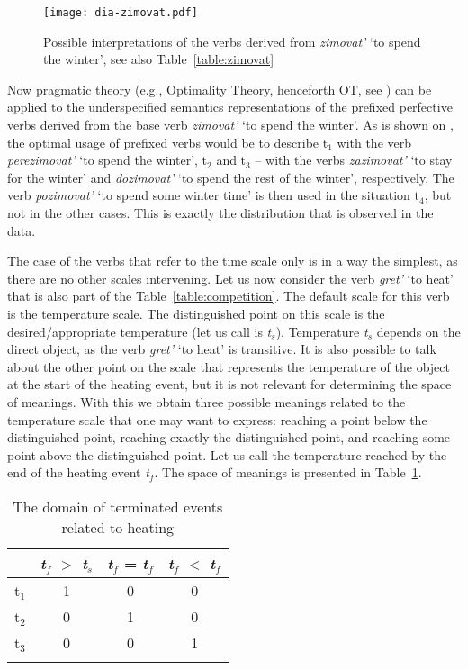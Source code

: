 \begin{figure}
\centering
\texttt{[image: dia-zimovat.pdf]}
\caption{Possible interpretations of the verbs derived from \textit{zimovat'} `to spend the winter', see also Table~\ref{table:zimovat} \label{fig:zimovat}}
\end{figure}

Now pragmatic theory (e.g., Optimality Theory, henceforth OT, see \citealt{Blutner:00, vanRooy:04, Benz:11}) can be applied to the underspecified semantics representations of the prefixed perfective verbs derived from the base verb \textit{zimovat'} `to spend the winter'. As is shown on , the optimal usage of prefixed verbs would be to describe t$_1$ with the verb \textit{perezimovat'} `to spend the winter', t$_2$ and t$_3$ -- with the verbs \textit{zazimovat'} `to stay for the winter' and \textit{dozimovat'} `to spend the rest of the winter', respectively. The verb \textit{pozimovat'} `to spend some winter time' is then used in the situation t$_4$, but not in the other cases. This is exactly the distribution that is observed in the data. 

The case of the verbs that refer to the time scale only is in a way the simplest, as there are no other scales intervening. Let us now consider the verb \textit{gret'} `to heat' that is also part of the Table~\ref{table:competition}. The default scale for this verb is the temperature scale. The distinguished point on this scale is the desired/appropriate temperature (let us call is \textit{t$_s$}). Temperature \textit{t$_s$} depends on the direct object, as the verb \textit{gret'} `to heat' is transitive. It is also possible to talk about the other point on the scale that represents the temperature of the object at the start of the heating event, but it is not relevant for determining the space of meanings. With this we obtain three possible meanings related to the temperature scale that one may want to express: reaching a point below the distinguished point, reaching exactly the distinguished point, and reaching some point above the distinguished point. Let us call the temperature reached by the end of the heating event \textit{t$_f$}. The space of meanings is presented in Table~\ref{table:gret}.

\begin{table}
\caption{The domain of terminated events related to heating \label{table:gret}}
\begin{tabular}{lccc}
\lsptoprule
 & \textit{t$_f$} $>$ \textit{t$_s$} & \textit{t$_f$} = \textit{t$_f$} & \textit{t$_f$} $<$ \textit{t$_f$}\\
\midrule
t$_1$ & 1 & 0 & 0\\
t$_2$ & 0 & 1 & 0\\
t$_3$ & 0 & 0 & 1\\
\lspbottomrule
\end{tabular}
\end{table}

